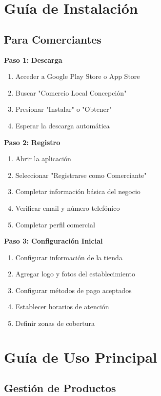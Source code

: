 \documentclass[12pt,a4paper]{report}
\begin{document}
\section{Guía de Instalación}

\subsection{Para Comerciantes}

\textbf{Paso 1: Descarga}
\begin{enumerate}
	\item Acceder a Google Play Store o App Store
	\item Buscar "Comercio Local Concepción"
	\item Presionar "Instalar" o "Obtener"
	\item Esperar la descarga automática
\end{enumerate}

\textbf{Paso 2: Registro}
\begin{enumerate}
	\item Abrir la aplicación
	\item Seleccionar "Registrarse como Comerciante"
	\item Completar información básica del negocio
	\item Verificar email y número telefónico
	\item Completar perfil comercial
\end{enumerate}

\textbf{Paso 3: Configuración Inicial}
\begin{enumerate}
	\item Configurar información de la tienda
	\item Agregar logo y fotos del establecimiento
	\item Configurar métodos de pago aceptados
	\item Establecer horarios de atención
	\item Definir zonas de cobertura
\end{enumerate}

\section{Guía de Uso Principal}

\subsection{Gestión de Productos}
\end{document}
